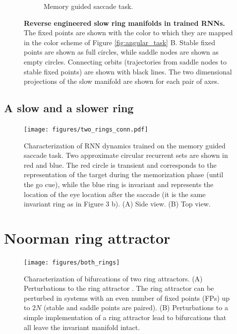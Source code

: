 \documentclass{article}
\newcounter{ct}
\theoremstyle{definition}
\theoremstyle{remark}
\begin{document}
\begin{figure}[htbp]
\begin{subfigure}[b]{0.45\textwidth}
        \caption{Memory guided saccade task.}
    \label{fig:slowcenterout}
    \end{subfigure}
    \caption{\textbf{Reverse engineered slow ring manifolds in trained RNNs.}
    The fixed points are shown with the color to which they are mapped in the color scheme of Figure \ref{fig:angular_task} B.
    Stable fixed points are shown as full circles, while saddle nodes are shown as empty circles.
    Connecting orbits (trajectories from saddle nodes to stable fixed points) are shown with black lines.
    The two dimensional projections of the slow manifold are shown for each pair of axes.
    }
    \label{fig:slowmanifolds}
\end{figure}

\newpage
\subsection{A slow and a slower ring}
\begin{figure}[tbhp]
     \centering
  \texttt{[image: figures/two\_rings\_conn.pdf]}
       \caption{Characterization of RNN dynamics trained on the memory guided saccade task.
       Two approximate circular recurrent sets are shown in red and blue. 
       The red circle is transient and corresponds to the representation of the target during the memorization phase (until the go cue), while the blue ring is invariant and represents the location of the eye location after the saccade (it is the same invariant ring as in Figure 3 b).
       (A) Side view.
       (B) Top view.
       }
         \label{fig:two_rings_conn}
\end{figure}

\newpage
\section{Noorman ring attractor}
\begin{figure}[tbhp]
     \centering
  \texttt{[image: figures/both\_rings]}
       \caption{Characterization of bifurcations of two ring attractors. 
       (A)       Perturbations to the ring attractor \citep{noorman2022}. The ring attractor can be perturbed in systems with an even number of fixed points (FPs)  up to $2N$ (stable and saddle points are paired). 
       (B) Perturbations to a simple implementation of a ring attractor lead to bifurcations that all leave the invariant manifold intact.
       }
         \label{fig:both_rings}
\end{figure}
\end{document}

